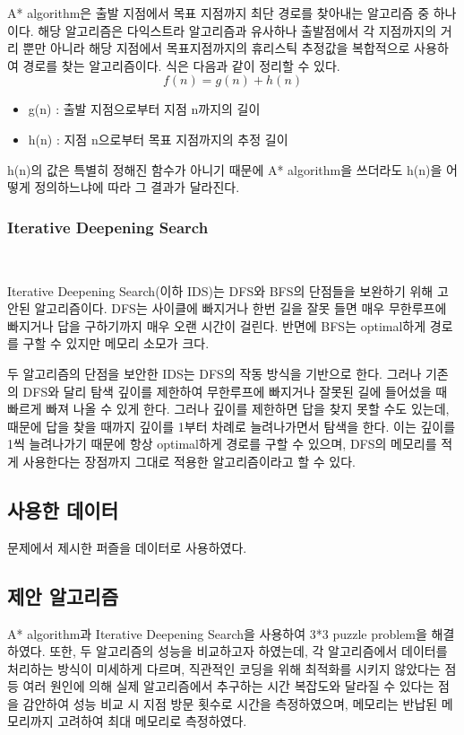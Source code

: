 \documentclass[manuscript,screen,review]{acmart}
\begin{document}
A* algorithm은 출발 지점에서 목표 지점까지 최단 경로를 찾아내는 알고리즘 중 하나이다.
해당 알고리즘은 다익스트라 알고리즘과 유사하나 출발점에서 각 지점까지의 거리 뿐만 아니라 해당 지점에서 목표지점까지의 휴리스틱 추정값을 복합적으로 사용하여 경로를 찾는 알고리즘이다. 식은 다음과 같이 정리할 수 있다.
\begin{equation}
  f(n) = g(n) + h(n)
\end{equation}
\begin{itemize}
  \item g(n) : 출발 지점으로부터 지점 n까지의 길이
  \item h(n) : 지점 n으로부터 목표 지점까지의 추정 길이
\end{itemize}
h(n)의 값은 특별히 정해진 함수가 아니기 때문에 A* algorithm을 쓰더라도 h(n)을 어떻게 정의하느냐에 따라 그 결과가 달라진다.

\subsubsection{Iterative Deepening Search}\

Iterative Deepening Search(이하 IDS)는 DFS와 BFS의 단점들을 보완하기 위해 고안된 알고리즘이다. DFS는 사이클에 빠지거나 한번 길을 잘못 들면 매우 무한루프에 빠지거나 답을 구하기까지 매우 오랜 시간이 걸린다. 반면에 BFS는 optimal하게 경로를 구할 수 있지만 메모리 소모가 크다.

두 알고리즘의 단점을 보안한 IDS는 DFS의 작동 방식을 기반으로 한다. 그러나 기존의 DFS와 달리 탐색 깊이를 제한하여 무한루프에 빠지거나 잘못된 길에 들어섰을 때 빠르게 빠져 나올 수 있게 한다. 그러나 깊이를 제한하면 답을 찾지 못할 수도 있는데, 때문에 답을 찾을 때까지 깊이를 1부터 차례로 늘려나가면서 탐색을 한다. 이는 깊이를 1씩 늘려나가기 때문에 항상 optimal하게 경로를 구할 수 있으며, DFS의 메모리를 적게 사용한다는 장점까지 그대로 적용한 알고리즘이라고 할 수 있다.

\subsection{사용한 데이터}

문제에서 제시한 퍼즐을 데이터로 사용하였다.

\subsection{제안 알고리즘}

A* algorithm과 Iterative Deepening Search을 사용하여 3*3 puzzle problem을 해결하였다. 또한, 두 알고리즘의 성능을 비교하고자 하였는데, 각 알고리즘에서 데이터를 처리하는 방식이 미세하게 다르며, 직관적인 코딩을 위해 최적화를 시키지 않았다는 점 등 여러 원인에 의해 실제 알고리즘에서 추구하는 시간 복잡도와 달라질 수 있다는 점을 감안하여 성능 비교 시 지점 방문 횟수로 시간을 측정하였으며, 메모리는 반납된 메모리까지 고려하여 최대 메모리로 측정하였다.
\end{document}
